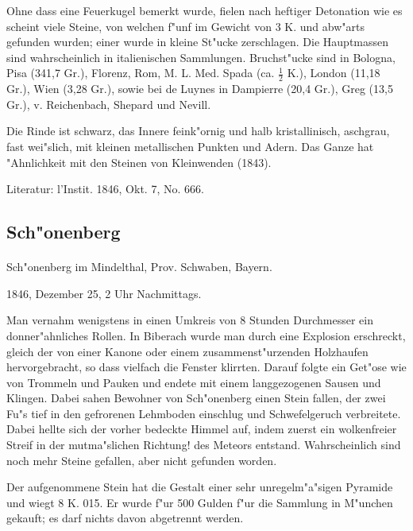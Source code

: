 \documentclass[a4paper, 11pt, oneside]{article}
\begin{document}
Ohne dass eine Feuerkugel bemerkt wurde, fielen nach heftiger Detonation wie es scheint viele Steine, von welchen f"unf im Gewicht von 3 K. und abw"arts gefunden wurden; einer wurde in kleine St"ucke zerschlagen. Die Hauptmassen sind wahrscheinlich in italienischen Sammlungen. Bruchst"ucke sind in Bologna, Pisa (341,7 Gr.), Florenz, Rom, M. L. Med. Spada (ca. $\frac{1}{2}$ K.), London (11,18 Gr.), Wien (3,28 Gr.), sowie bei de Luynes in Dampierre (20,4 Gr.), Greg (13,5 Gr.), v. Reichenbach, Shepard und Nevill.

Die Rinde ist schwarz, das Innere feink"ornig und halb kristallinisch, aschgrau, fast wei"slich, mit kleinen metallischen Punkten und Adern. Das Ganze hat "Ahnlichkeit mit den Steinen von Kleinwenden (1843).

\footnotesize
Literatur: l'Instit. 1846, Okt. 7, No. 666.

\subsection{Sch"onenberg}
\normalsize
\paragraph{}
Sch"onenberg im Mindelthal, Prov. Schwaben, Bayern.

1846, Dezember 25, 2 Uhr Nachmittags.

Man vernahm wenigstens in einen Umkreis von 8 Stunden Durchmesser ein donner"ahnliches Rollen. In Biberach wurde man durch eine Explosion erschreckt, gleich der von einer Kanone oder einem zusammenst"urzenden Holzhaufen hervorgebracht, so dass vielfach die Fenster klirrten. Darauf folgte ein Get"ose wie von Trommeln und Pauken und endete mit einem langgezogenen Sausen und Klingen. Dabei sahen Bewohner von Sch"onenberg einen Stein fallen, der zwei Fu"s tief in den gefrorenen Lehmboden einschlug und Schwefelgeruch verbreitete. Dabei hellte sich der vorher bedeckte Himmel auf, indem zuerst ein wolkenfreier Streif in der mutma"slichen Richtung! des Meteors entstand. Wahrscheinlich sind noch mehr Steine gefallen, aber nicht gefunden worden.

Der aufgenommene Stein hat die Gestalt einer sehr unregelm"a"sigen Pyramide und wiegt 8 K. 015. Er wurde f"ur 500 Gulden f"ur die Sammlung in M"unchen gekauft; es darf nichts davon abgetrennt werden.
\end{document}
